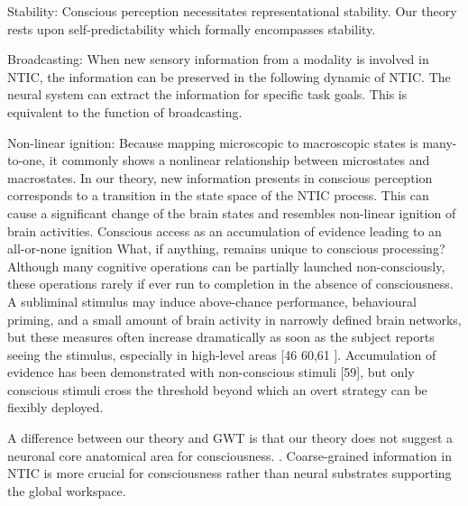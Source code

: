 \documentclass[utf8]{article}
\begin{document}
		
		Stability: Conscious perception necessitates representational stability. Our theory rests upon self-predictability which formally encompasses stability.
		
		
		Broadcasting: When new sensory information from a modality is involved in NTIC, the information can be preserved in the following dynamic of NTIC. The neural system can extract the information for specific task goals. This is equivalent to the function of broadcasting. 
		
		Non-linear ignition: Because mapping microscopic to macroscopic states is many-to-one, it commonly shows a nonlinear relationship between microstates and macrostates. In our theory, new information presents in conscious perception corresponds to a transition in the state space of the NTIC process. This can cause a significant change of the brain states and resembles non-linear ignition of brain activities. Conscious access as an accumulation of evidence leading to an all-or-none ignition What, if anything, remains unique to conscious processing? Although many cognitive operations can be partially launched non-consciously, these operations rarely if ever run to completion in the absence of consciousness. A subliminal stimulus may induce above-chance performance, behavioural priming, and a small amount of brain activity in narrowly defined brain networks, but these measures often increase dramatically as soon as the subject reports seeing the stimulus, especially in high-level areas [46 60,61  ]. Accumulation of evidence has been demonstrated with non-conscious stimuli [59], but only conscious stimuli cross the threshold beyond which an overt strategy can be fiexibly deployed. 
		
		A difference between our theory and GWT is that our theory does not suggest a neuronal core anatomical area for consciousness. . Coarse-grained information in NTIC is more crucial for consciousness rather than neural substrates supporting the global workspace.
		
\end{document}
